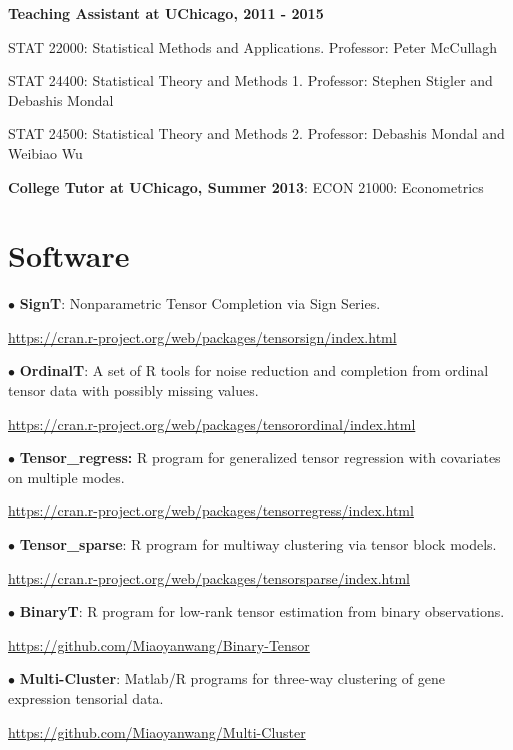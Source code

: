 \documentclass[letterpaper]{article}
\renewenvironment{itemize}{
  \begin{list}{}{
    \setlength{\leftmargin}{1.5em}
  }
}{
  \end{list}
}
\begin{document}
{\bf Teaching Assistant at UChicago, 2011 - 2015}
\begin{itemize}
\item STAT 22000: Statistical Methods and Applications. Professor: Peter McCullagh
\item STAT 24400: Statistical Theory and Methods 1. Professor: Stephen Stigler and Debashis Mondal 
\item STAT 24500: Statistical Theory and Methods 2. Professor: Debashis Mondal and Weibiao Wu
 \end{itemize}
 {\bf College Tutor at UChicago, Summer 2013}: ECON 21000: Econometrics


\section*{Software}
\begin{itemize}
\item $\bullet$ {\bf SignT}: Nonparametric Tensor Completion via Sign Series.

\url{https://cran.r-project.org/web/packages/tensorsign/index.html}

\item  $\bullet$ {\bf OrdinalT}: A set of R tools for noise reduction and completion from ordinal tensor data with possibly missing values. 

\url{https://cran.r-project.org/web/packages/tensorordinal/index.html}

\item $\bullet$ {\bf Tensor\_regress:} R program for generalized tensor regression with covariates on multiple modes. 

\url{https://cran.r-project.org/web/packages/tensorregress/index.html}

\item $\bullet$ {\bf Tensor\_sparse}: R program for multiway clustering via tensor block models. 

\url{https://cran.r-project.org/web/packages/tensorsparse/index.html}

\item $\bullet$ {\bf BinaryT}: R program for low-rank tensor estimation from binary observations.

\url{https://github.com/Miaoyanwang/Binary-Tensor}

\item $\bullet$ {\bf Multi-Cluster}: Matlab/R programs for three-way clustering of gene expression tensorial data. 

\url{https://github.com/Miaoyanwang/Multi-Cluster}


\end{itemize}
\end{document}
